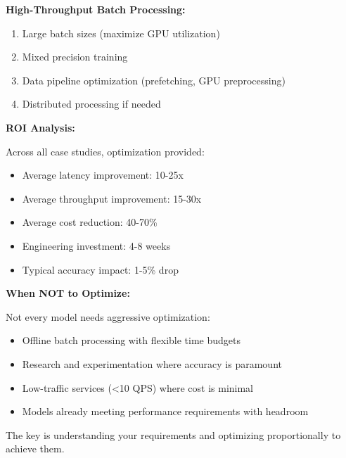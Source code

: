 \textbf{High-Throughput Batch Processing:}
\begin{enumerate}
    \item Large batch sizes (maximize GPU utilization)
    \item Mixed precision training
    \item Data pipeline optimization (prefetching, GPU preprocessing)
    \item Distributed processing if needed
\end{enumerate}

\textbf{ROI Analysis:}

Across all case studies, optimization provided:
\begin{itemize}
    \item Average latency improvement: 10-25x
    \item Average throughput improvement: 15-30x
    \item Average cost reduction: 40-70\%
    \item Engineering investment: 4-8 weeks
    \item Typical accuracy impact: 1-5\% drop
\end{itemize}

\textbf{When NOT to Optimize:}

Not every model needs aggressive optimization:
\begin{itemize}
    \item Offline batch processing with flexible time budgets
    \item Research and experimentation where accuracy is paramount
    \item Low-traffic services (<10 QPS) where cost is minimal
    \item Models already meeting performance requirements with headroom
\end{itemize}

The key is understanding your requirements and optimizing proportionally to achieve them.


